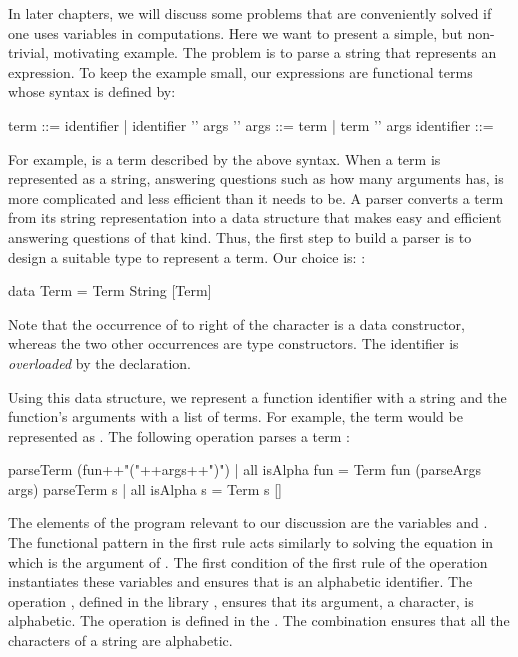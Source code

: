 In later chapters, we will discuss some problems that
are conveniently solved if one uses variables in computations.
Here we want to present a simple, but non-trivial, motivating example.
The problem is to parse a string that represents an expression.
To keep the example small, our expressions are functional terms
whose syntax is defined by:
%
\begin{prog}
term       ::= identifier
            |  identifier '\code{(}' args '\code{)}'
args       ::= term
            |  term '\code{,}' args
identifier ::= 
\end{prog}
%
For example,  is a term described
by the above syntax.
When a term is represented as a string,
answering questions such as how many arguments  has,
is more complicated and less efficient than it needs to be.
A parser converts a term from its string representation into
a data structure that
makes easy and efficient answering questions of that kind.
Thus, the first step to build a parser is to design a suitable type
to represent a term. Our choice is:
:
%
\begin{prog}
data Term = Term String [Term]
\end{prog}
%
Note that the occurrence of  to right of the \ccode{=}
character is a data constructor, whereas the two other occurrences
are type constructors.  The  identifier
is \emph{overloaded} by the declaration.

Using this data structure, we represent a function identifier with
a string and the function's arguments with a list of terms.  For
example, the term  would be represented as
.
The following operation parses a term
:
%
\begin{prog}
parseTerm (fun++"("++args++")") | all isAlpha fun = Term fun (parseArgs args)
parseTerm s | all isAlpha s = Term s []
\end{prog}
%
The elements of the program relevant to our discussion are
the variables  and .
The functional pattern in the first rule acts similarly to solving the
equation  in which 
is the argument of .
The first condition of the first rule of the operation 
instantiates these variables and ensures that 
is an alphabetic identifier.
The operation , defined in the library ,
ensures that its argument, a character, is alphabetic.
The operation  is defined in the .
The combination  ensures that all the characters
of a string are alphabetic.


